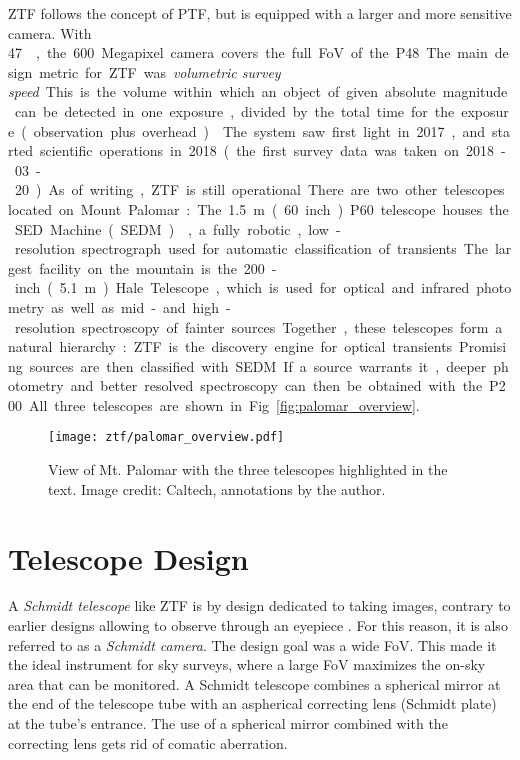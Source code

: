 ZTF follows the concept of PTF, but is equipped with a larger and more sensitive camera. With \SI{47}{\square\deg}, the 600 Megapixel camera covers the full FoV of the P48. The main design metric for ZTF was \textit{volumetric survey speed}. This is the volume within which an object of given absolute magnitude can be detected in one exposure, divided by the total time for the exposure (observation plus overhead) . The system saw first light in 2017, and started scientific operations in 2018 (the first survey data was taken on 2018-03-20). As of writing, ZTF is still operational.

There are two other telescopes located on Mount Palomar: The \SI{1.5}{\meter} (60 inch) P60 telescope houses the SED Machine (SEDM) , a fully robotic, low-resolution spectrograph used for automatic classification of transients. The largest facility on the mountain is the 200-inch (\SI{5.1}{\meter}) Hale Telescope, which is used for optical and infrared photometry as well as mid- and high-resolution spectroscopy of fainter sources. Together, these telescopes form a natural hierarchy: ZTF is the discovery engine for optical transients. Promising sources are then classified with SEDM. If a source warrants it, deeper photometry and better resolved spectroscopy can then be obtained with the P200. All three telescopes are shown in Fig. \ref{fig:palomar_overview}.

\begin{figure*}[]
    \texttt{[image: ztf/palomar\_overview.pdf]}
    \caption[View of Mt. Palomar]{View of Mt. Palomar with the three telescopes highlighted in the text. Image credit: Caltech, annotations by the author.}
\end{figure*}

\section{Telescope Design} \label{telescope_design}
A \textit{Schmidt telescope} like ZTF is by design dedicated to taking images, contrary to earlier designs allowing to observe through an eyepiece . For this reason, it is also referred to as a \textit{Schmidt camera}. The design goal was a wide FoV. This made it the ideal instrument for sky surveys, where a large FoV maximizes the on-sky area that can be monitored. A Schmidt telescope combines a spherical mirror at the end of the telescope tube with an aspherical correcting lens (Schmidt plate) at the tube's entrance. The use of a spherical mirror combined with the correcting lens gets rid of comatic aberration.

